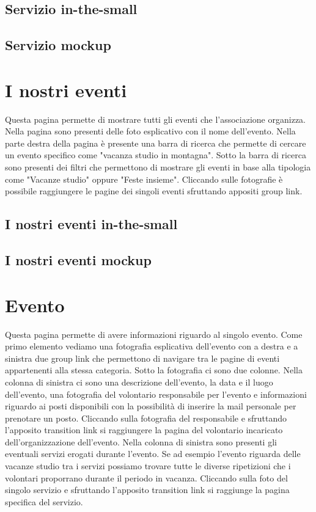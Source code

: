         \subsection{Servizio in-the-small}

        \subsection{Servizio mockup}

    \section{I nostri eventi}
    Questa pagina permette di mostrare tutti gli eventi che l'associazione
    organizza. Nella pagina sono presenti delle foto esplicativo con il nome
    dell'evento. Nella parte destra della pagina è presente una barra di ricerca
    che permette di cercare un evento specifico come "vacanza studio in
    montagna". Sotto la barra di ricerca sono presenti dei filtri che permettono
    di mostrare gli eventi in base alla tipologia come "Vacanze studio" oppure
    "Feste insieme". Cliccando sulle fotografie è possibile raggiungere le
    pagine dei singoli eventi sfruttando appositi group link.

        \subsection{I nostri eventi in-the-small}

        \subsection{I nostri eventi mockup}
    
    \section{Evento}
    Questa pagina permette di avere informazioni riguardo al singolo evento.
    Come primo elemento vediamo una fotografia esplicativa dell'evento con a
    destra e a sinistra due group link che permettono di navigare tra le pagine
    di eventi appartenenti alla stessa categoria. Sotto la fotografia ci sono
    due colonne. Nella colonna di sinistra ci sono una descrizione dell'evento,
    la data e il luogo dell'evento, una fotografia del volontario responsabile
    per l'evento e informazioni riguardo ai posti disponibili con la possibilità
    di inserire la mail personale per prenotare un posto. Cliccando sulla
    fotografia del responsabile e sfruttando l'apposito transition link si
    raggiungere la pagina del volontario incaricato dell'organizzazione
    dell'evento. Nella colonna di sinistra sono presenti gli eventuali servizi
    erogati durante l'evento. Se ad esempio l'evento riguarda delle vacanze
    studio tra i servizi possiamo trovare tutte le diverse ripetizioni che i
    volontari proporrano durante il periodo in vacanza. Cliccando sulla foto del
    singolo servizio e sfruttando l'apposito transition link si raggiunge la
    pagina specifica del servizio.

